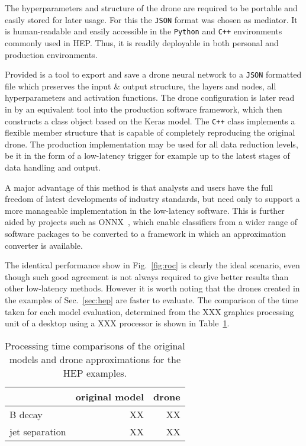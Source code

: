 The hyperparameters and structure of the drone are required to be 
portable and easily stored for later usage. For this the {\tt JSON} format was chosen as 
mediator. It is human-readable and easily accessible in the {\tt Python} and {\tt C++}
environments commonly used in HEP. Thus, it is readily deployable in both personal and production environments.

Provided is a tool to export and save a drone neural network to a {\tt JSON} 
formatted file which preserves the input \& output structure, 
the layers and nodes, all hyperparameters and activation functions. 
The drone configuration is later read in by an equivalent tool into the production software framework,
which then constructs a class object based on the Keras model. The {\tt C++} class implements 
a flexible member structure that is capable of completely reproducing the original drone. The production
implementation may be used for all data reduction levels, be it in the form of a low-latency trigger
for example up to the latest stages of data handling and output. 

A major advantage of this method is that analysts and users have the full freedom of latest developments
of industry standards, but need only to support a more manageable implementation in the low-latency
software. This is further aided by projects such as ONNX~\cite{ONNX}, which enable classifiers from a wider
range of software packages to be converted to a framework in which an approximation converter
is available.

The identical performance show in Fig.~\ref{fig:roc} is clearly the ideal scenario, even though
such good agreement is not always required to give better results than other low-latency methods.
However it is worth noting that the drones created in the examples of Sec.~\ref{sec:hep} are faster to
evaluate. The comparison of the time taken for each model evaluation, determined from the XXX graphics processing unit of a desktop
using a XXX processor is shown in Table~\ref{tab:comp}.
\begin{table}[t]
  \centering
  \caption{Processing time comparisons of the original models and drone
  approximations for the HEP examples. \label{tab:comp}}
  \begin{tabular}{l|rr}
   & original model & drone \\\hline
    B decay & XX & XX \\
    jet separation & XX & XX \\
  \end{tabular}
\end{table}
